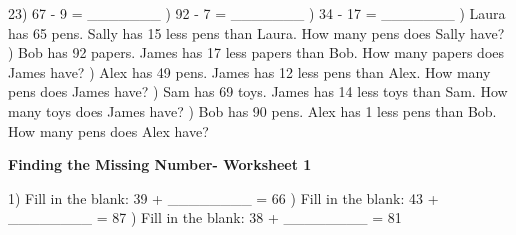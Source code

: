 \documentclass{article}%
\begin{document}
23) 67 {-} 9 = \_\_\_\_\_\_\_%
\newline%
\newline%
) 92 {-} 7 = \_\_\_\_\_\_\_%
\newline%
\newline%
) 34 {-} 17 = \_\_\_\_\_\_\_%
\newline%
\newline%
) Laura has 65 pens. Sally has 15 less pens than Laura. How many pens does Sally have?%
\newline%
\newline%
) Bob has 92 papers. James has 17 less papers than Bob. How many papers does James have?%
\newline%
\newline%
) Alex has 49 pens. James has 12 less pens than Alex. How many pens does James have?%
\newline%
\newline%
) Sam has 69 toys. James has 14 less toys than Sam. How many toys does James have?%
\newline%
\newline%
) Bob has 90 pens. Alex has 1 less pens than Bob. How many pens does Alex have?%
\newline%
\newline%
\newline%
\pagebreak%
\large%
\begin{center}%
\textbf{Finding the Missing Number- Worksheet 1}%
\newline%
\newline%
\newline%
\end{center} \normalsize%
1) Fill in the blank: 39 + \_\_\_\_\_\_\_\_ = 66%
\newline%
\newline%
) Fill in the blank: 43 + \_\_\_\_\_\_\_\_ = 87%
\newline%
\newline%
) Fill in the blank: 38 + \_\_\_\_\_\_\_\_ = 81%
\newline%
\newline%
\end{document}
